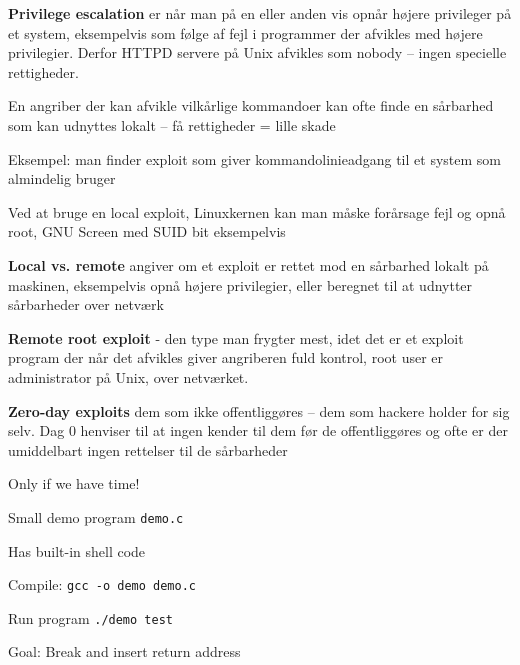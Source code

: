 \documentclass[Screen16to9,17pt]{foils}
\begin{document}
\begin{list1}
\item {\bfseries Privilege escalation} er når man på en eller anden vis
opnår højere privileger på et system, eksempelvis som
følge af fejl i programmer der afvikles med højere
privilegier. Derfor HTTPD servere på Unix afvikles som
nobody -- ingen specielle rettigheder.
\item En angriber der kan afvikle vilkårlige kommandoer kan ofte finde
  en sårbarhed som kan udnyttes lokalt -- få rettigheder = lille skade
\end{list1}

Eksempel: man finder exploit som giver kommandolinieadgang til et system
som almindelig bruger

Ved at bruge en local exploit, Linuxkernen kan man måske forårsage fejl
og opnå root, GNU Screen med SUID bit eksempelvis



\begin{list1}
\item {\bfseries Local vs. remote}
angiver om et exploit er rettet mod
en sårbarhed lokalt på maskinen, eksempelvis
opnå højere privilegier, eller beregnet
til at udnytter sårbarheder over netværk
\item {\bfseries Remote root exploit}
- den type man frygter mest, idet
det er et exploit program der når det afvikles giver
angriberen fuld kontrol, root user er administrator
på Unix, over netværket.
\item {\bfseries Zero-day exploits} dem som ikke offentliggøres -- dem
  som hackere holder for sig selv. Dag 0 henviser til at ingen kender
  til dem før de offentliggøres og ofte er der umiddelbart ingen
  rettelser til de sårbarheder
\end{list1}





Only if we have time!

\begin{list2}
\item Small demo program \verb+demo.c+
\item Has built-in shell code
\item Compile:
\verb+gcc -o demo demo.c+
\item Run program
\verb+./demo test+
\item Goal: Break and insert return address
\end{list2}
\end{document}
